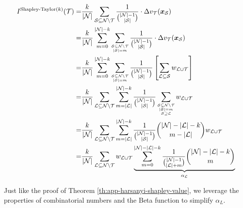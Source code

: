 \begin{small}
\begin{align*}
I^{\textrm{Shapley-Taylor}(k)}(\mathcal{T}) =& \frac{k}{|\mathcal{N}|}\sum_{\mathcal{S}\subseteq \mathcal{N}\backslash \mathcal{T}}\frac{1}{\binom{|\mathcal{N}|-1}{|\mathcal{S}|}}\cdot \Delta v_\mathcal{T}(\boldsymbol{x}_{\mathcal{S}})\\
=& \frac{k}{|\mathcal{N}|}\sum_{m=0}^{|\mathcal{N}|-k}\sum_{\scriptsize\substack{\mathcal{S}\subseteq \mathcal{N}\backslash \mathcal{T}\\|\mathcal{S}|=m}}\frac{1}{\binom{|\mathcal{N}|-1}{|\mathcal{S}|}}\cdot \Delta v_\mathcal{T}(\boldsymbol{x}_{\mathcal{S}})\\
=& \frac{k}{|\mathcal{N}|}\sum_{m=0}^{|\mathcal{N}|-k}\sum_{\scriptsize\substack{\mathcal{S}\subseteq \mathcal{N}\backslash \mathcal{T}\\|\mathcal{S}|=m}}\frac{1}{\binom{|\mathcal{N}|-1}{|\mathcal{S}|}} \left[\sum_{\mathcal{L}\subseteq \mathcal{S}}  w_{\mathcal{L}\cup \mathcal{T}} \right]\\
=& \frac{k}{|\mathcal{N}|}\sum_{\mathcal{L}\subseteq \mathcal{N}\backslash \mathcal{T}}\sum_{m=|\mathcal{L}|}^{|\mathcal{N}|-k}\frac{1}{\binom{|\mathcal{N}|-1}{|\mathcal{S}|}}\sum_{\scriptsize\substack{\mathcal{S}\subseteq \mathcal{N}\backslash \mathcal{T}\\|\mathcal{S}|=m\\\mathcal{S}\supseteq \mathcal{L}}} w_{\mathcal{L}\cup \mathcal{T}} \\
=& \frac{k}{|\mathcal{N}|}\sum_{\mathcal{L}\subseteq \mathcal{N}\backslash \mathcal{T}}\sum_{m=|\mathcal{L}|}^{|\mathcal{N}|-k}\frac{1}{\binom{|\mathcal{N}|-1}{|\mathcal{S}|}}\binom{|\mathcal{N}|-|\mathcal{L}|-k}{m-|\mathcal{L}|} w_{\mathcal{L}\cup \mathcal{T}} \\
=& \frac{k}{|\mathcal{N}|}\sum_{\mathcal{L}\subseteq \mathcal{N}\backslash \mathcal{T}} w_{\mathcal{L}\cup \mathcal{T}} \underbrace{\sum_{m=0}^{|\mathcal{N}|-|\mathcal{L}|-k}\frac{1}{\binom{|\mathcal{N}|-1}{|\mathcal{L}|+m}}\binom{|\mathcal{N}|-|\mathcal{L}|-k}{m}}_{\alpha_\mathcal{L}}
\end{align*}
\end{small}

Just like the proof of Theorem \ref{th:app-harsanyi-shapley-value}, we leverage the properties of combinatorial numbers and the Beta function to simplify {\small$\alpha_L$}.


